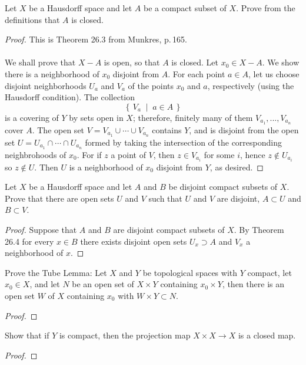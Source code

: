 \begin{problem}
Let $X$ be a Hausdorff space and let $A$ be a compact subset of
$X$. Prove from the definitions that $A$ is closed.
\end{problem}
\begin{proof}
This is Theorem 26.3 from Munkres, p.\,165.
\\\\
We shall prove that $X-A$ is open, so that $A$ is closed. Let $x_0\in
X-A$. We show there is a neighborhood of $x_0$ disjoint from $A$. For each
point $a\in A$, let us choose disjoint neighborhoods $U_a$ and $V_a$ of the
points $x_0$ and $a$, respectively (using the Hausdorff condition). The
collection
\[
\left\{\,V_a\;\middle|\;a\in A\,\right\}
\]
is a covering of $Y$ by sets open in $X$; therefore, finitely many of them
$V_{a_1},...,V_{a_n}$ cover $A$. The open set $V=V_{a_1}\cup\cdots\cup
V_{a_n}$ contains $Y$, and is disjoint from the open set
$U=U_{a_1}\cap\cdots\cap U_{a_n}$ formed by taking the intersection of the
corresponding neighbrohoods of $x_0$. For if $z$ a point of $V$, then $z\in
V_{a_i}$ for some $i$, hence $z\notin U_{a_i}$ so $z\notin U$. Then $U$ is
a neighborhood of $x_0$ disjoint from $Y$, as desired.
\end{proof}
\begin{problem}
Let $X$ be a Hausdorff space and let $A$ and $B$ be disjoint
compact subsets of $X$. Prove that there are open sets $U$ and
$V$ such that $U$ and $V$ are disjoint, $A\subset U$ and
$B\subset V$.
\end{problem}
\begin{proof}
Suppose that $A$ and $B$ are disjoint compact subsets of $X$. By Theorem
26.4 for every $x\in B$ there exists disjoint open sets $U_x\supset A$ and
$V_x$ a neighborhood of $x$.
\end{proof}
\begin{problem}
Prove the Tube Lemma: Let $X$ and $Y$ be topological spaces with
$Y$ compact, let $x_0\in X$, and let $N$ be an open set of
$X\times Y$ containing $x_0\times Y$, then there is an open set
$W$ of $X$ containing $x_0$ with $W\times Y\subset
N$.
\end{problem}
\begin{proof}
\end{proof}
\begin{problem}
Show that if $Y$ is compact, then the projection map $X\times
X\to X$ is a closed map.
\end{problem}
\begin{proof}
\end{proof}
